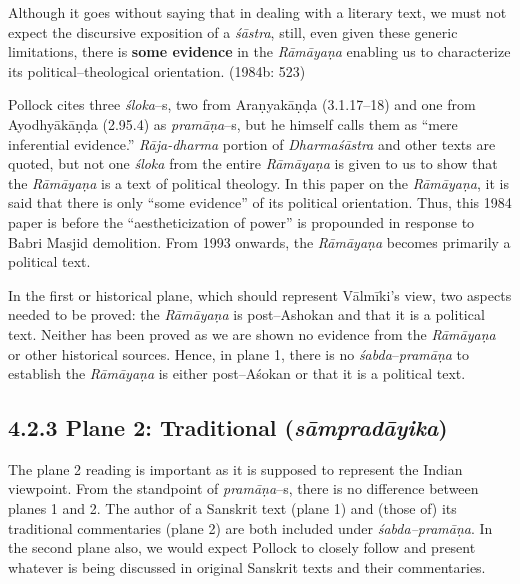 \begin{myquote}
Although it goes without saying that in dealing with a literary text, we must not expect the discursive exposition of a \textit{śāstra}, still, even given these generic limitations, there is \textbf{some evidence} in the \textit{Rāmāyaṇa} enabling us to characterize its political–theological orientation. (1984b: 523)
\end{myquote}

Pollock cites three \textit{śloka}–s, two from Araṇyakāṇḍa (3.1.17–18) and one from Ayodhyākāṇḍa (2.95.4) as \textit{pramāṇa}–s, but he himself calls them as “mere inferential evidence.” \textit{Rāja-dharma} portion of \textit{Dharmaśāstra} and other texts are quoted, but not one \textit{śloka} from the entire \textit{Rāmāyaṇa} is given to us to show that the \textit{Rāmāyaṇa} is a text of political theology. In this paper on the \textit{Rāmāyaṇa}, it is said that there is only “some evidence” of its political orientation. Thus, this 1984 paper is before the “aestheticization of power” is propounded in response to Babri Masjid demolition. From 1993 onwards, the \textit{Rāmāyaṇa} becomes primarily a political text.

In the first or historical plane, which should represent Vālmīki’s view, two aspects needed to be proved: the \textit{Rāmāyaṇa} is post–Ashokan and that it is a political text. Neither has been proved as we are shown no evidence from the \textit{Rāmāyaṇa} or other historical sources. Hence, in plane 1, there is no \textit{śabda}–\textit{pramāṇa} to establish the \textit{Rāmāyaṇa} is either post–Aśokan or that it is a political text.

\vspace{-.2cm}

\subsection*{4.2.3 Plane 2: Traditional ({\it {\bfseries sāmpradāyika}})}

The plane 2 reading is important as it is supposed to represent the Indian viewpoint. From the standpoint of \textit{pramāṇa}–s, there is no difference between planes 1 and 2. The author of a Sanskrit text (plane 1) and (those of) its traditional commentaries (plane 2) are both included under \textit{śabda–pramāṇa}. In the second plane also, we would expect Pollock to closely follow and present whatever is being discussed in original Sanskrit texts and their commentaries.

